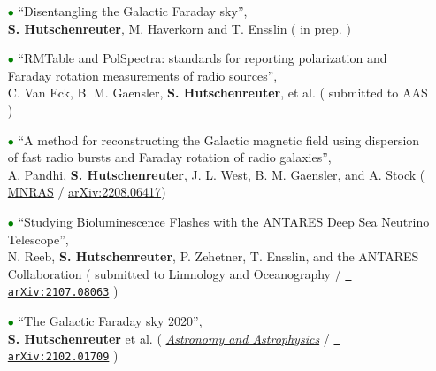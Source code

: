 \begin{itemize}

\item[\textcolor{Green}{$\bullet$}]{``Disentangling the Galactic Faraday sky'', \\
 \textbf{S. Hutschenreuter}, M. Haverkorn and  T. Ensslin ({\color{blue}  in prep. } })

\vspace{6pt}

\item[\textcolor{Green}{$\bullet$}]{``RMTable and PolSpectra: standards for reporting polarization and Faraday rotation measurements of radio sources'', \\
C. Van Eck, B. M. Gaensler, \textbf{S. Hutschenreuter}, et al. ({\color{blue}  submitted to AAS} })

\vspace{6pt}

\item[\textcolor{Green}{$\bullet$}]{``A method for reconstructing the Galactic magnetic field using dispersion of fast radio bursts and Faraday rotation of radio galaxies'', \\
A. Pandhi, \textbf{S. Hutschenreuter}, J. L. West, B. M. Gaensler, and A. Stock ({\color{blue} \href{https://doi.org/10.1093/mnras/stac2314}{MNRAS} / \href{https://arxiv.org/abs/2208.06417}{arXiv:2208.06417}})}

\vspace{6pt}

\item[\textcolor{Green}{$\bullet$}]{``Studying Bioluminescence Flashes with the ANTARES Deep Sea Neutrino Telescope'', \\
N. Reeb, \textbf{S. Hutschenreuter}, P. Zehetner, T. Ensslin, and the ANTARES Collaboration ({\color{blue} submitted to Limnology and Oceanography / \href{https://arxiv.org/abs/2107.08063}{\texttt{{\color{blue} arXiv:2107.08063}}}} })

\vspace{6pt}

\item[\textcolor{Green}{$\bullet$}]{``The Galactic Faraday sky 2020'', \\
\textbf{S. Hutschenreuter} et al. ({\color{blue} \href{https://www.aanda.org/articles/aa/abs/2022/01/aa40486-21/aa40486-21.htmll}{\textit{Astronomy and Astrophysics}} /  \href{https://arxiv.org/abs/2102.01709}{\texttt{{\color{blue} arXiv:2102.01709}}}} })

\vspace{6pt}


\end{itemize}
